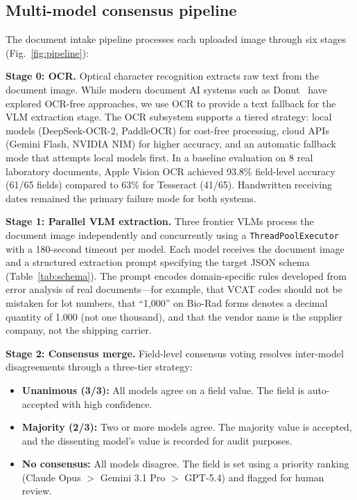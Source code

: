 \documentclass[11pt]{article}
\begin{document}
\subsection{Multi-model consensus pipeline}
\label{sec:pipeline}

The document intake pipeline processes each uploaded image through six
stages (Fig.~\ref{fig:pipeline}):

\textbf{Stage 0: OCR.} Optical character recognition extracts raw text
from the document image. While modern document AI systems such as
Donut~\citep{kim2022donut} have explored OCR-free approaches, we use
OCR to provide a text fallback for the VLM extraction stage. The OCR
subsystem supports a tiered strategy:
local models (DeepSeek-OCR-2, PaddleOCR) for cost-free processing, cloud
APIs (Gemini Flash, NVIDIA NIM) for higher accuracy, and an automatic
fallback mode that attempts local models first. In a baseline evaluation
on 8 real laboratory documents, Apple Vision OCR achieved 93.8\% field-level
accuracy (61/65 fields) compared to 63\% for Tesseract (41/65).
Handwritten receiving dates remained the primary failure mode for both
systems.

\textbf{Stage 1: Parallel VLM extraction.} Three frontier VLMs process
the document image independently and concurrently using a
\texttt{ThreadPoolExecutor} with a 180-second timeout per model. Each
model receives the document image and a structured extraction prompt
specifying the target JSON schema (Table~\ref{tab:schema}). The prompt
encodes domain-specific rules developed from error analysis of real
documents---for example, that VCAT codes should not be mistaken for lot
numbers, that ``1,000'' on Bio-Rad forms denotes a decimal quantity of
1.000 (not one thousand), and that the vendor name is the supplier company,
not the shipping carrier.

\textbf{Stage 2: Consensus merge.} Field-level consensus voting resolves
inter-model disagreements through a three-tier strategy:
\begin{itemize}
  \item \textbf{Unanimous (3/3):} All models agree on a field value.
    The field is auto-accepted with high confidence.
  \item \textbf{Majority (2/3):} Two or more models agree. The majority
    value is accepted, and the dissenting model's value is recorded for
    audit purposes.
  \item \textbf{No consensus:} All models disagree. The field is set
    using a priority ranking (Claude Opus $>$ Gemini 3.1 Pro $>$ GPT-5.4)
    and flagged for human review.
\end{itemize}
\end{document}
